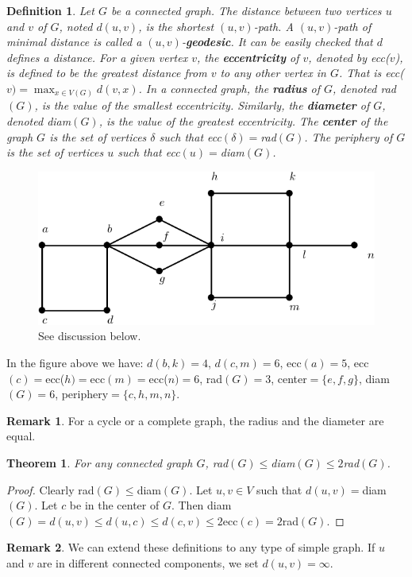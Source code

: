 \documentclass[12pt,a4paper]{article}
\newtheorem{thm}{Theorem}[section]
\newtheorem{defn}{Definition}[section]
\theoremstyle{definition}
\newtheorem{rem}{Remark}[section]
\begin{document}
\begin{defn} Let $G$ be a connected graph. The distance between two vertices $u$ and $v$ of $G$, noted $d(u,v)$, is the shortest $(u,v)$-path. A $(u,v)$-path of minimal distance is called a $(u,v)$-\textbf{geodesic}. It can be easily checked that $d$ defines a distance. For a given vertex $v$, the \textbf{eccentricity} of $v$, denoted by ecc($v$), is defined to be the greatest distance from $v$ to any other vertex in $G$. That is ecc($v)= \max_{x \in V(G)} d(v,x) $. In a connected graph, the \textbf{radius} of $G$, denoted rad$(G)$, is the value of the smallest eccentricity. Similarly,  the \textbf{diameter} of $G$, denoted diam$(G)$, is the value of the greatest eccentricity. The \textbf{center} of the graph $G$ is the set of vertices $\delta$ such that ecc$(\delta)=$rad$(G)$. The periphery of $G$ is the set of vertices $u$ such that ecc$(u)=$diam$(G)$. 
\end{defn}
\begin{figure}[hbtp]
\centering
\includegraphics[scale=1]{images/graph23.pdf}
\caption{See discussion below.}
\end{figure}
In the figure above we have: $d(b, k)=4$,  $d(c,m)=6$, ecc$(a)=5$, ecc$(c)=$ecc($h)=$ecc$(m)=$ecc($n)=6$, rad$(G)=3$, center$=\{e,f,g\}$, diam$(G)=6$, periphery$=\{c,h,m,n\}.$
\begin{rem} For a cycle or a complete graph, the radius and the diameter are equal. 
\end{rem}
\begin{thm} For any connected graph $G$, rad$(G) \leq$diam$(G) \leq 2 $rad$(G)$. 
\end{thm}
\begin{proof}
Clearly rad$(G) \leq$diam$(G)$. Let $u,v \in V$ such that $d(u,v)=$diam$(G)$. Let $c$ be in the center of $G$. Then diam$(G)=d(u,v) \leq d(u,c) \leq d(c,v) \leq 2 $ecc$(c)=2$rad$(G)$. 
\end{proof}
\begin{rem} We can extend these definitions to any type of simple graph. If $u$ and $v$ are in different connected components, we set $d(u,v)= \infty$. 
\end{rem}
\end{document}
